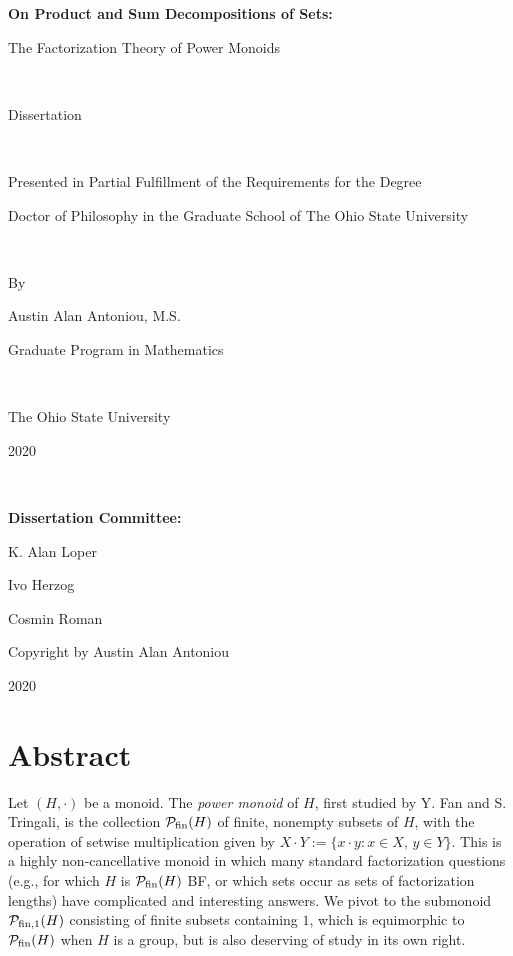 \frontmatter

\begin{titlepage}
\begin{center}
	{\LARGE \bf On Product and Sum Decompositions of Sets: \\ \vspace{3mm}
		
		The Factorization Theory of Power Monoids}

\

	Dissertation

\
	
	Presented in Partial Fulfillment of the Requirements 
	for the Degree 
	
	Doctor of Philosophy 
	in the Graduate School of The Ohio State University

\
		
	By 
	
	{\large Austin Alan Antoniou, M.S. 
	
	Graduate Program in Mathematics}

\
	
	The Ohio State University
	
	2020

\

	{\large {\bf Dissertation Committee:}
	
	K. Alan Loper
	
	Ivo Herzog
	
	Cosmin Roman}
\end{center}

\end{titlepage}
\hspace{0pt}
\vfill
\begin{center}
{\Large Copyright by Austin Alan Antoniou

2020}
\end{center}
\setcounter{page}{1}
\vfill
\pagestyle{empty}
\chapter{Abstract}
Let $(H,\cdot)$ be a monoid.
The \textit{power monoid} of $H$, first studied by Y. Fan and S. Tringali, is the collection $\mathcal{P}_{\textrm{fin}}(H)$ of finite, nonempty subsets of $H$, with the operation of setwise multiplication given by $X\cdot Y := \{x\cdot y: x\in X, \, y\in Y\}$.
This is a highly non-cancellative monoid in which many standard factorization questions (e.g., for which $H$ is $\mathcal{P}_{\textrm{fin}}(H)$ BF, or which sets occur as sets of factorization lengths) have complicated and interesting answers.
We pivot to the submonoid $\mathcal{P}_{\textrm{fin}, 1}(H)$ consisting of finite subsets containing $1$, which is equimorphic to $\mathcal{P}_{\textrm{fin}}(H)$ when $H$ is a group, but is also deserving of study in its own right.

